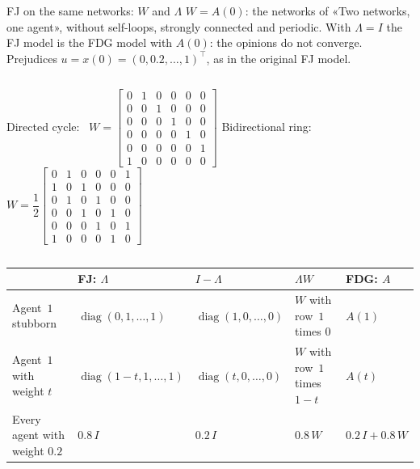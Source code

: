 \begin{frame}[label=m-fj-matrices]{FJ on the same networks: $W$ and $\Lambda$}
  \footnotesize
  $W = A(0)$: the networks of «Two networks, one agent», without self-loops, strongly
  connected and periodic. With $\Lambda = I$ the FJ model is the FDG model with $A(0)$: the
  opinions do not converge. Prejudices $u = x(0) = (0, 0.2, \dots, 1)^\top$, as in the
  original FJ model.

  {\setlength{\arraycolsep}{3.5pt}\renewcommand{\arraystretch}{0.8}%
  \begin{columns}[c]
      \centering
      Directed cycle: \
      $W = \begin{bmatrix}
        0&1&0&0&0&0\\ 0&0&1&0&0&0\\ 0&0&0&1&0&0\\ 0&0&0&0&1&0\\ 0&0&0&0&0&1\\ 1&0&0&0&0&0
      \end{bmatrix}$
      \centering
      Bidirectional ring: \
      $W = \dfrac12 \begin{bmatrix}
        0&1&0&0&0&1\\ 1&0&1&0&0&0\\ 0&1&0&1&0&0\\ 0&0&1&0&1&0\\ 0&0&0&1&0&1\\ 1&0&0&0&1&0
      \end{bmatrix}$
  \end{columns}}

  \smallskip
  \scriptsize
  \renewcommand{\arraystretch}{1.1}
  \begin{tabular}{@{}lllll@{}}
    \toprule
    & \textbf{FJ}: $\Lambda$ & $I - \Lambda$ & $\Lambda W$ & \textbf{FDG}: $A$ \\
    \midrule
    Agent~$1$ stubborn & $\operatorname{diag}(0, 1, \dots, 1)$
      & $\operatorname{diag}(1, 0, \dots, 0)$ & $W$ with row~$1$ times $0$ & $A(1)$ \\
    Agent~$1$ with weight $t$ & $\operatorname{diag}(1-t, 1, \dots, 1)$
      & $\operatorname{diag}(t, 0, \dots, 0)$ & $W$ with row~$1$ times $1-t$ & $A(t)$ \\
    Every agent with weight $0.2$ & $0.8\,I$ & $0.2\,I$ & $0.8\,W$ & $0.2\,I + 0.8\,W$ \\
    \bottomrule
  \end{tabular}


\end{frame}
